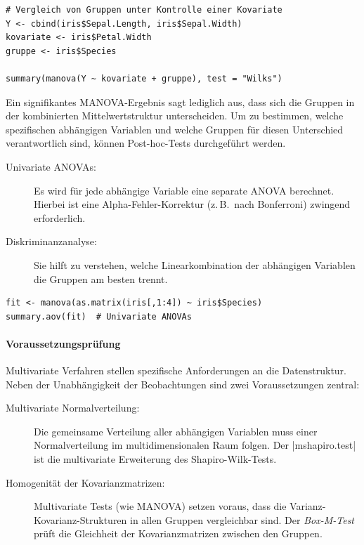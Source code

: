\documentclass[10pt,twocolumn]{scrartcl}
\renewcommand{\lstinline}{\mycoloredinline}
\begin{document}
\begin{lstlisting}
# Vergleich von Gruppen unter Kontrolle einer Kovariate
Y <- cbind(iris$Sepal.Length, iris$Sepal.Width)
kovariate <- iris$Petal.Width
gruppe <- iris$Species

summary(manova(Y ~ kovariate + gruppe), test = "Wilks")
\end{lstlisting}

Ein signifikantes MANOVA-Ergebnis sagt lediglich aus, dass sich die Gruppen in der kombinierten Mittelwertstruktur unterscheiden. Um zu bestimmen, welche spezifischen abhängigen Variablen und welche Gruppen für diesen Unterschied verantwortlich sind, können Post-hoc-Tests durchgeführt werden.

\begin{description}
\item[Univariate ANOVAs:] Es wird für jede abhängige Variable eine separate ANOVA berechnet. Hierbei ist eine Alpha-Fehler-Korrektur (z.\,B.\ nach Bonferroni) zwingend erforderlich.
\item[Diskriminanzanalyse:] Sie hilft zu verstehen, welche Linearkombination der abhängigen Variablen die Gruppen am besten trennt.
\end{description}

\begin{lstlisting}
fit <- manova(as.matrix(iris[,1:4]) ~ iris$Species)
summary.aov(fit)  # Univariate ANOVAs
\end{lstlisting}

\paragraph{Voraussetzungsprüfung}

Multivariate Verfahren stellen spezifische Anforderungen an die Datenstruktur. Neben der Unabhängigkeit der Beobachtungen sind zwei Voraussetzungen zentral:

\begin{description}
\item[Multivariate Normalverteilung:] Die gemeinsame Verteilung aller abhängigen Variablen muss einer Normalverteilung im multidimensionalen Raum folgen. Der \lstinline|mshapiro.test| ist die multivariate Erweiterung des Shapiro-Wilk-Tests.
\item[Homogenität der Kovarianzmatrizen:] Multivariate Tests (wie MANOVA) setzen voraus, dass die Varianz-Kovarianz-Strukturen in allen Gruppen vergleichbar sind. Der \emph{Box-M-Test} prüft die Gleichheit der Kovarianzmatrizen zwischen den Gruppen.
\end{description}
\end{document}
